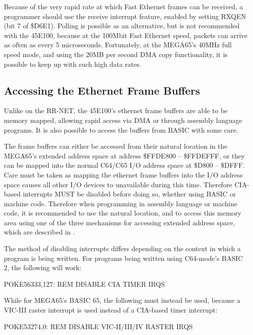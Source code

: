Because of the very rapid rate at which Fast Ethernet frames can be received, a programmer should use the
receive interrupt feature, enabled by setting RXQEN (bit 7 of \$D6E1).  Polling is possible as an alternative, but
is not recommended with the 45E100, because at the 100Mbit Fast Ethernet speed, packets can arrive
as often as every 5 microseconds.  Fortunately, at the MEGA65's 40MHz full speed mode, and using
the 20MB per second DMA copy functionality, it is possible to keep up with such high data rates.

\subsection{Accessing the Ethernet Frame Buffers}

Unlike on the RR-NET, the 45E100's ethernet frame buffers are able to be memory mapped, allowing rapid access via DMA
or through assembly language programs.  It is also possible to access the buffers from BASIC with some care.

The frame buffers can either be accessed from their natural location in the MEGA65's extended address space at address
\$FFDE800 -- \$FFDEFFF, or they can be mapped into the normal C64/C65 I/O address space at \$D800 -- \$DFFF.  Care must be
taken as mapping the ethernet frame buffers into the I/O address space causes all other I/O devices to unavailable
during this time.  Therefore CIA-based interrupts MUST be disabled before doing so, whether using BASIC or machine code.  Therefore
when programming in assembly language or machine code, it is recommended to use the natural location, and to access this
memory area using one of the three mechanisms for accessing extended address space, which are described in .

The method of
disabling interrupts differs depending on the context in which a program is being written. For programs being written using C64-mode's BASIC 2, the following will work:

\begin{screencode}
  POKE56333,127: REM DISABLE CIA TIMER IRQS
\end{screencode}

While for MEGA65's BASIC 65, the following must instead be used, because a VIC-III raster interrupt is used instead of a CIA-based timer interrupt:

\begin{screencode}
POKE53274,0: REM DISABLE VIC-II/III/IV RASTER IRQS
\end{screencode}

